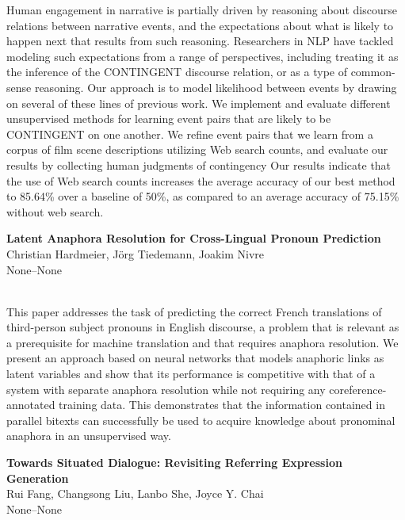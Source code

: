 \documentclass[twoside,makeidx]{book}
\renewcommand{\normalsize}{\fontsize{8}{9}\selectfont}
\renewcommand{\small}{\fontsize{7}{8}\selectfont}
\begin{document}
\nopagebreak%
\noindent%
{\small Human engagement in narrative is partially driven by reasoning about discourse relations between narrative events, and the expectations about what is likely to happen next that results from such reasoning. Researchers in NLP have tackled modeling such expectations from a range of perspectives, including treating it as the inference of the CONTINGENT discourse relation, or as a type of common-sense reasoning. Our approach is to model likelihood between events by drawing on several of these lines of previous work. We implement and evaluate different unsupervised methods for learning event pairs that are likely to be CONTINGENT on one another. We refine event pairs that we learn from a corpus of film scene descriptions utilizing Web search counts, and evaluate our results by collecting human judgments of contingency Our results indicate that the use of Web search counts increases the average accuracy of our best method to 85.64\% over a baseline of 50\%, as compared to an average accuracy of 75.15\% without web search.}
\par\vspace{2em}\noindent%
\begin{minipage}{\linewidth}%
\begin{center}
\textbf{\normalsize Latent Anaphora Resolution for Cross-Lingual Pronoun Prediction}\\
\normalsize  Christian Hardmeier,  J\"{o}rg Tiedemann,  Joakim Nivre\\
{\small None--None}\\
\end{center}
\end{minipage}\\[0.5em]
\nopagebreak%
\noindent%
{\small This paper addresses the task of predicting the correct French translations of third-person subject pronouns in English discourse, a problem that is relevant as a prerequisite for machine translation and that requires anaphora resolution. We present an approach based on neural networks that models anaphoric links as latent variables and show that its performance is competitive with that of a system with separate anaphora resolution while not requiring any coreference-annotated training data. This demonstrates that the information contained in parallel bitexts can successfully be used to acquire knowledge about pronominal anaphora in an unsupervised way.}
\par\vspace{2em}\noindent%
\begin{minipage}{\linewidth}%
\begin{center}
\textbf{\normalsize Towards Situated Dialogue: Revisiting Referring Expression Generation}\\
\normalsize  Rui Fang,  Changsong Liu,  Lanbo She,  Joyce Y. Chai\\
{\small None--None}\\
\end{center}
\end{minipage}\\[0.5em]
\end{document}

